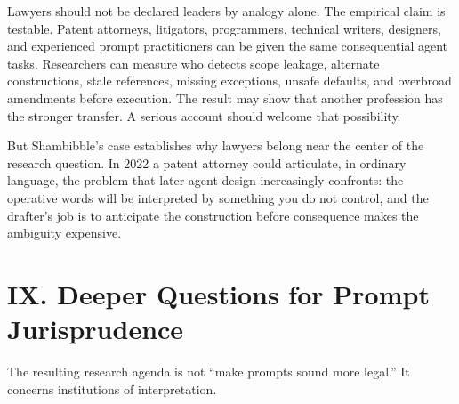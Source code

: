 \documentclass[11pt]{article}
\begin{document}
Lawyers should not be declared leaders by analogy alone. The empirical claim is testable. Patent attorneys, litigators, programmers, technical writers, designers, and experienced prompt practitioners can be given the same consequential agent tasks. Researchers can measure who detects scope leakage, alternate constructions, stale references, missing exceptions, unsafe defaults, and overbroad amendments before execution. The result may show that another profession has the stronger transfer. A serious account should welcome that possibility.

But Shambibble's case establishes why lawyers belong near the center of the research question. In 2022 a patent attorney could articulate, in ordinary language, the problem that later agent design increasingly confronts: the operative words will be interpreted by something you do not control, and the drafter's job is to anticipate the construction before consequence makes the ambiguity expensive.

\section*{IX. Deeper Questions for Prompt Jurisprudence}
The resulting research agenda is not ``make prompts sound more legal.'' It concerns institutions of interpretation.
\end{document}
